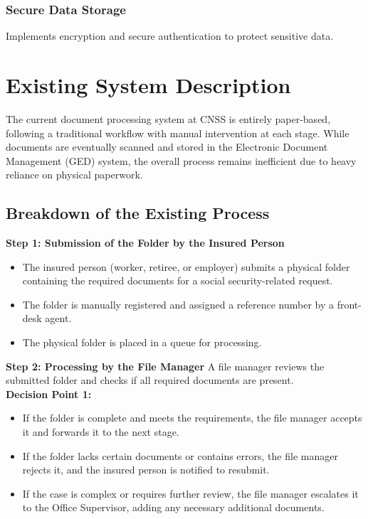 \subsubsection{ Secure Data Storage}
Implements encryption and secure authentication to protect sensitive data.


\section{Existing System Description}
The current document processing system at CNSS is entirely paper-based, following a traditional workflow with manual intervention at each stage. While documents are eventually scanned and stored in the Electronic Document Management (GED) system, the overall process remains inefficient due to heavy reliance on physical paperwork.
\subsection{Breakdown of the Existing Process}
\textbf{ Step 1: Submission of the Folder by the Insured Person}
\begin{itemize}
    \item The insured person (worker, retiree, or employer) submits a physical folder containing the required documents for a social security-related request.
    \item The folder is manually registered and assigned a reference number by a front-desk agent.
    \item The physical folder is placed in a queue for processing.
\end{itemize}

 \textbf{ Step 2: Processing by the File Manager}
A file manager reviews the submitted folder and checks if all required documents are present.\\
\textbf{Decision Point 1:}
\begin{itemize}
    \item If the folder is complete and meets the requirements, the file manager accepts it and forwards it to the next stage.
    \item If the folder lacks certain documents or contains errors, the file manager rejects it, and the insured person is notified to resubmit.
    \item If the case is complex or requires further review, the file manager escalates it to the Office Supervisor, adding any necessary additional documents.
\end{itemize}

